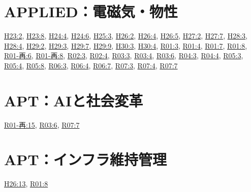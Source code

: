 \section{APPLIED：電磁気・物性}
\hyperref[q:h23-reg-applied-02]{H23:2}, \hyperref[q:h23-reg-applied-08]{H23:8}, \hyperref[q:h24-reg-applied-04]{H24:4}, \hyperref[q:h24-reg-applied-06]{H24:6}, \hyperref[q:h25-reg-applied-03]{H25:3}, \hyperref[q:h26-reg-applied-02]{H26:2}, \hyperref[q:h26-reg-applied-04]{H26:4}, \hyperref[q:h26-reg-applied-05]{H26:5}, \hyperref[q:h27-reg-applied-02]{H27:2}, \hyperref[q:h27-reg-applied-07]{H27:7}, \hyperref[q:h28-reg-applied-03]{H28:3}, \hyperref[q:h28-reg-applied-04]{H28:4}, \hyperref[q:h29-reg-applied-02]{H29:2}, \hyperref[q:h29-reg-applied-03]{H29:3}, \hyperref[q:h29-reg-applied-07]{H29:7}, \hyperref[q:h29-reg-applied-09]{H29:9}, \hyperref[q:h30-reg-applied-03]{H30:3}, \hyperref[q:h30-reg-applied-04]{H30:4}, \hyperref[q:r01-reg-applied-03]{R01:3}, \hyperref[q:r01-reg-applied-04]{R01:4}, \hyperref[q:r01-reg-applied-07]{R01:7}, \hyperref[q:r01-reg-applied-08]{R01:8}, \hyperref[q:r01-ret-applied-06]{R01-再:6}, \hyperref[q:r01-ret-applied-08]{R01-再:8}, \hyperref[q:r02-reg-applied-03]{R02:3}, \hyperref[q:r02-reg-applied-04]{R02:4}, \hyperref[q:r03-reg-applied-03]{R03:3}, \hyperref[q:r03-reg-applied-04]{R03:4}, \hyperref[q:r03-reg-applied-06]{R03:6}, \hyperref[q:r04-reg-applied-03]{R04:3}, \hyperref[q:r04-reg-applied-04]{R04:4}, \hyperref[q:r05-reg-applied-03]{R05:3}, \hyperref[q:r05-reg-applied-04]{R05:4}, \hyperref[q:r05-reg-applied-08]{R05:8}, \hyperref[q:r06-reg-applied-03]{R06:3}, \hyperref[q:r06-reg-applied-04]{R06:4}, \hyperref[q:r06-reg-applied-07]{R06:7}, \hyperref[q:r07-reg-applied-03]{R07:3}, \hyperref[q:r07-reg-applied-04]{R07:4}, \hyperref[q:r07-reg-applied-07]{R07:7}
\section{APT：AIと社会変革}
\hyperref[q:r01-ret-apt-15]{R01-再:15}, \hyperref[q:r03-reg-apt-06]{R03:6}, \hyperref[q:r07-reg-apt-07]{R07:7}
\section{APT：インフラ維持管理}
\hyperref[q:h26-reg-apt-13]{H26:13}, \hyperref[q:r01-reg-apt-08]{R01:8}
